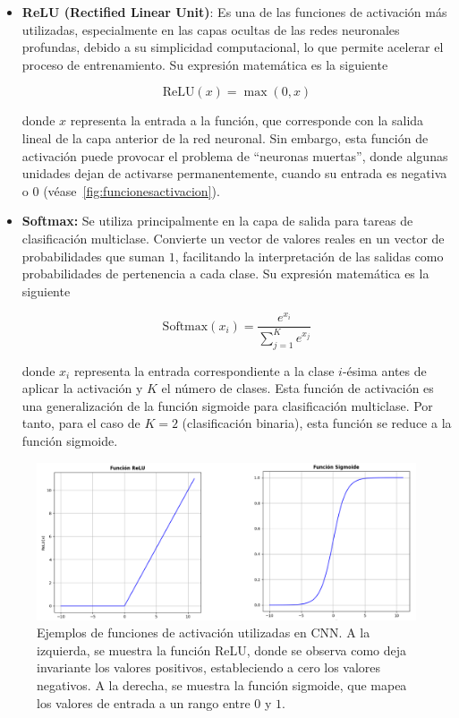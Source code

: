 \begin{itemize}
    \item \textbf{ReLU (Rectified Linear Unit)}: Es una de las funciones de activación más utilizadas, especialmente en las capas ocultas de las redes neuronales profundas, debido a su simplicidad computacional, lo que permite acelerar el proceso de entrenamiento. Su expresión matemática es la siguiente
    
    \[
        \text{ReLU}(x) = \max(0, x)
    \]

    donde $x$ representa la entrada a la función, que corresponde con la salida lineal de la capa anterior de la red neuronal. Sin embargo, esta función de activación puede provocar el problema de ``neuronas muertas'', donde algunas unidades dejan de activarse permanentemente, cuando su entrada es negativa o $0$ (véase~\autoref{fig:funcionesactivacion}).

    \item \textbf{Softmax:} Se utiliza principalmente en la capa de salida para tareas de clasificación multiclase. Convierte un vector de valores reales en un vector de probabilidades que suman $1$, facilitando la interpretación de las salidas como probabilidades de pertenencia a cada clase. Su expresión matemática es la siguiente
 
    \[
        \text{Softmax}(x_i) = \frac{e^{x_i}}{\sum_{j=1}^{K} e^{x_j}}
    \]

    donde $x_i$ representa la entrada correspondiente a la clase $i$-ésima antes de aplicar la activación y $K$ el número de clases. Esta función de activación es una generalización de la función sigmoide para clasificación multiclase. Por tanto, para el caso de $K=2$ (clasificación binaria), esta función se reduce a la función sigmoide.\newline

\end{itemize}

\begin{figure}[h]
    \centering
    \includegraphics[width=0.8\linewidth]{img/funcionesactivacion.png}
    \caption[Ejemplos de funciones de activación utilizadas en CNN.]{Ejemplos de funciones de activación utilizadas en CNN. A la izquierda, se muestra la función ReLU, donde se observa como deja invariante los valores positivos, estableciendo a cero los valores negativos. A la derecha, se muestra la función sigmoide, que mapea los valores de entrada a un rango entre $0$ y $1$.}\label{fig:funcionesactivacion}
\end{figure}

